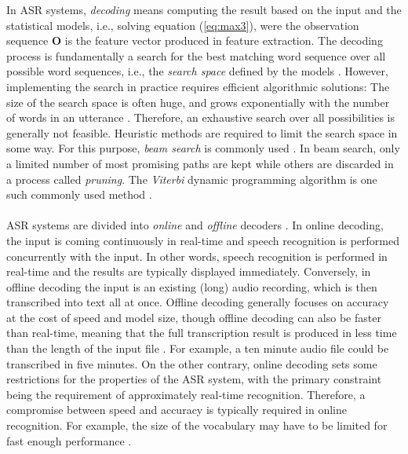 \documentclass[english, 12pt, a4paper, pdftex, elec, utf8]{aaltothesis}
\begin{document}
In ASR systems, \textit{decoding} means computing the result based on the input and the statistical models, i.e., solving equation (\ref{eq:max3}), were the observation sequence $\bm{O}$ is the feature vector produced in feature extraction. The decoding process is fundamentally a search for the best matching word sequence over all possible word sequences, i.e., the \textit{search space} defined by the models \cite{pylkkonen2013towards}. However, implementing the search in practice requires efficient algorithmic solutions: The size of the search space is often huge, and grows exponentially with the number of words in an utterance \cite{pylkkonen2013towards}. Therefore, an exhaustive search over all possibilities is generally not feasible. Heuristic methods are required to limit the search space in some way. For this purpose, \textit{beam search} is commonly used \cite{pylkkonen2013towards, hori2013speech}. In beam search, only a limited number of most promising paths are kept while others are discarded in a process called \textit{pruning}. The \textit{Viterbi} dynamic programming algorithm is one such commonly used method \cite{huang2001spoken, yu2014automatic, hori2013speech}. \\\\
ASR systems are divided into \textit{online} and \textit{offline} decoders \cite{alumae2014full}. In online decoding, the input is coming continuously in real-time and speech recognition is performed concurrently with the input. In other words, speech recognition is performed in real-time and the results are typically displayed immediately. Conversely, in offline decoding the input is an existing (long) audio recording, which is then transcribed into text all at once. Offline decoding generally focuses on accuracy at the cost of speed and model size, though offline decoding can also be faster than real-time, meaning that the full transcription result is produced in less time than the length of the input file \cite{alumae2014recent}. For example, a ten minute audio file could be transcribed in five minutes. On the other contrary, online decoding sets some restrictions for the properties of the ASR system, with the primary constraint being the requirement of approximately real-time recognition. Therefore, a compromise between speed and accuracy is typically required in online recognition. For example, the size of the vocabulary may have to be limited for fast enough performance \cite{enarvi2017automatic, mcgraw2016personalized}. \\\\
\end{document}
